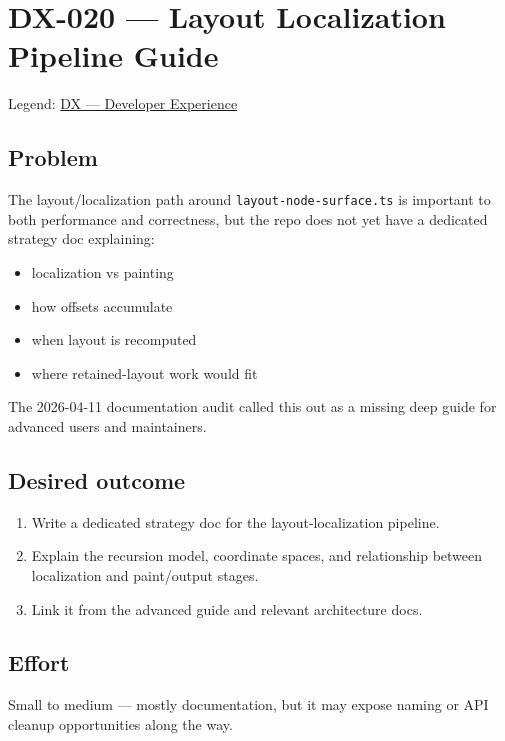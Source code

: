 \chapter{DX-020 --- Layout Localization Pipeline Guide}\label{record-331}

\smallskip

Legend: \href{https://github.com/flyingrobots/bijou/blob/cbd70612140e7a450d764b3c7be1c6af878b99bc/docs/method/graveyard/legends/DX-developer-experience.md}{DX --- Developer Experience}

\section{Problem}\label{record-331-problem}

The layout/localization path around \texttt{l\allowbreak{}a\allowbreak{}y\allowbreak{}o\allowbreak{}u\allowbreak{}t\allowbreak{}-\allowbreak{}n\allowbreak{}o\allowbreak{}d\allowbreak{}e\allowbreak{}-\allowbreak{}s\allowbreak{}u\allowbreak{}r\allowbreak{}f\allowbreak{}a\allowbreak{}c\allowbreak{}e\allowbreak{}.\allowbreak{}t\allowbreak{}s} is important to both performance and correctness, but the repo does not yet have a dedicated strategy doc explaining:

\begin{itemize}
\tightlist
\item
  localization vs painting
\item
  how offsets accumulate
\item
  when layout is recomputed
\item
  where retained-layout work would fit
\end{itemize}

The 2026-04-11 documentation audit called this out as a missing deep guide for advanced users and maintainers.

\section{Desired outcome}\label{record-331-desired-outcome}

\begin{enumerate}
\def\labelenumi{\arabic{enumi}.}
\tightlist
\item
  Write a dedicated strategy doc for the layout-localization pipeline.
\item
  Explain the recursion model, coordinate spaces, and relationship between localization and paint/output stages.
\item
  Link it from the advanced guide and relevant architecture docs.
\end{enumerate}

\section{Effort}\label{record-331-effort}

Small to medium --- mostly documentation, but it may expose naming or API cleanup opportunities along the way.

